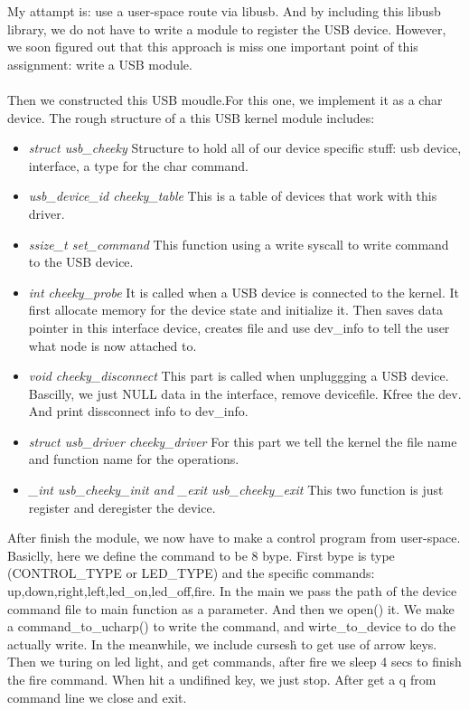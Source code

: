 \documentclass[12pt,letterpaper]{article}
\begin{document}
\indent My attampt is: use a user-space route via libusb. And by including this libusb library, we do not have to write a module to register the USB device. However, we soon figured out that this approach is miss one important point of this assignment: write a USB module. \\\\
\indent Then we constructed this USB moudle.For this one, we implement it as a char device. The rough structure of a this USB kernel module includes:
\begin{itemize}
\item \emph{struct usb\_cheeky} Structure to hold all of our device specific stuff: usb device, interface, a type for the char command.
\item \emph{usb\_device\_id cheeky\_table} This is a table of devices that work with this driver.
\item \emph{ssize\_t set\_command} This function using a write syscall to write command to the USB device.
\item \emph{int cheeky\_probe} It is called when a USB device is connected to the kernel. It first allocate memory for the device state and initialize it. Then saves data pointer in this interface device, creates file and use dev\_info to tell the user what node is now attached to.
\item \emph{void cheeky\_disconnect} This part is called when unpluggging a USB device. Bascilly, we just NULL data in the interface, remove devicefile. Kfree the dev. And print dissconnect info to dev\_info.
\item \emph{struct usb\_driver cheeky\_driver} For this part we tell the kernel the file name and function name for the operations.
\item \emph{\_int usb\_cheeky\_init and \_exit usb\_cheeky\_exit} This two function is just register and deregister the device.
\end{itemize}
\indent After finish the module, we now have to make a control program from user-space.  Basiclly, here we define the command to be 8 bype. First bype is type (CONTROL\_TYPE or LED\_TYPE) and the specific commands: up,down,right,left,led\_on,led\_off,fire. In the main we pass the path of the device command file to main function as a parameter. And then we open() it. We make a command\_to\_ucharp() to write the command, and wirte\_to\_device to do the actually write. In the meanwhile, we include curses\.h to get use of arrow keys. Then we turing on led light, and get commands, after fire we sleep 4 secs to finish the fire command. When hit a undifined key, we just stop. After get a q from command line we close and exit.\\\\
\end{document}
